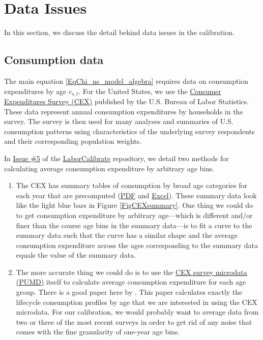 \documentclass[letterpaper,12pt]{article}
\theoremstyle{definition}
\begin{document}
\section{Data Issues}\label{SecData}

  In this section, we discuss the detail behind data issues in the calibration.


  \subsection{Consumption data}\label{SecDataCons}

    The main equation \eqref{EqChi_ns_model_algebra} requires data on consumption expenditures by age $c_{s,t}$. For the United States, we use the \href{https://www.bls.gov/cex/}{Consumer Expenditures Survey (CEX)} published by the U.S. Bureau of Labor Statistics. These data represent annual consumption expenditures by households in the survey. The survey is then used for many analyses and summaries of U.S. consumption patterns using characteristics of the underlying survey respondents and their corresponding population weights.

    In \href{https://github.com/OpenSourceMacro/LaborCalibrate/issues/5}{Issue \#5} of the \href{https://github.com/OpenSourceMacro/LaborCalibrate}{LaborCalibrate} repository, we detail two methods for calculating average consumption expenditure by arbitrary age bins.

    \begin{enumerate}
      \item The CEX has summary tables of consumption by broad age categories for each year that are precomputed (\href{https://www.bls.gov/cex/2016/combined/age.pdf}{PDF} and \href{https://www.bls.gov/cex/2016/combined/age.xlsx}{Excel}). These summary data look like the light blue bars in Figure \ref{FigCEXsummary}. One thing we could do to get consumption expenditure by arbitrary age---which is different and/or finer than the course age bins in the summary data---is to fit a curve to the summary data such that the curve has a similar shape and the average consumption expenditure across the ages corresponding to the summary data equals the value of the summary data.

      \item The more accurate thing we could do is to use the \href{https://www.bls.gov/cex/pumd.htm}{CEX survey microdata (PUMD)} itself to calculate average consumption expenditure for each age group. There is a good paper here by \citet{VillaverdeKrueger:2007}. This paper calculates exactly the lifecycle consumption profiles by age that we are interested in using the CEX microdata. For our calibration, we would probably want to average data from two or three of the most recent surveys in order to get rid of any noise that comes with the fine granularity of one-year age bins.
    \end{enumerate}
\end{document}
